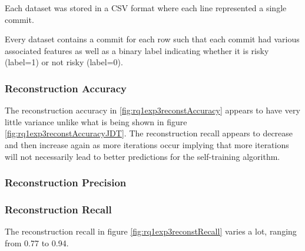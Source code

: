  Each dataset was stored in a CSV format where each line represented a single commit.
 
  Every dataset contains a commit for each row such that each commit had various associated features as well as a binary label indicating whether it is risky (label=1) or not risky (label=0). 
  
  
  
  
\subsubsection{Reconstruction Accuracy}


The reconstruction accuracy in \ref{fig:rq1exp3reconstAccuracy} appears to have very little variance unlike what is being shown in figure \ref{fig:rq1exp3reconstAccuracyJDT}. The reconstruction recall appears to decrease and then increase again as more iterations occur implying that more iterations will not necessarily lead to better predictions for the self-training algorithm. 

\subsubsection{Reconstruction Precision}



\subsubsection{Reconstruction Recall}


The reconstruction recall in figure \ref{fig:rq1exp3reconstRecall} varies a lot, ranging from 0.77 to 0.94. 

